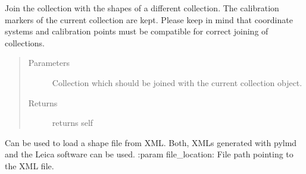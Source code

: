 \documentclass[a4paper,10pt,english,openany,oneside]{sphinxmanual}
\begin{document}
\begin{fulllineitems}
\begin{fulllineitems}
\begin{quote}
\begin{description}
\end{description}\end{quote}

\end{fulllineitems}


\begin{fulllineitems}
\label{\detokenize{pages/modules:lmd.lib.Collection.join}}
\sphinxAtStartPar
Join the collection with the shapes of a different collection. The calibration markers of the current collection are kept. Please keep in mind that coordinate systems and calibration points must be compatible for correct joining of collections.
\begin{quote}\begin{description}
\item[{Parameters}] \leavevmode
\sphinxAtStartPar
{} \textendash{} Collection which should be joined with the current collection object.

\item[{Returns}] \leavevmode
\sphinxAtStartPar
returns self

\end{description}\end{quote}

\end{fulllineitems}


\begin{fulllineitems}
\label{\detokenize{pages/modules:lmd.lib.Collection.load}}
\sphinxAtStartPar
Can be used to load a shape file from XML. Both, XMLs generated with py\sphinxhyphen{}lmd and the Leica software can be used.
:param file\_location: File path pointing to the XML file.

\end{fulllineitems}



\end{fulllineitems}
\end{document}

